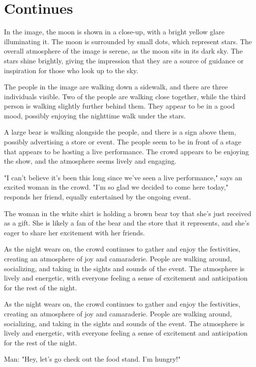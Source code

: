 \documentclass[smalldemyvopaper,11pt,twoside,onecolumn,openright,extrafontsizes]{memoir}
\begin{document}
\chapter{Continues}
In the image, the moon is shown in a close-up, with a bright yellow glare illuminating it. The moon is surrounded by small dots, which represent stars. The overall atmosphere of the image is serene, as the moon sits in its dark sky. The stars shine brightly, giving the impression that they are a source of guidance or inspiration for those who look up to the sky.\par
The people in the image are walking down a sidewalk, and there are three individuals visible. Two of the people are walking close together, while the third person is walking slightly further behind them. They appear to be in a good mood, possibly enjoying the nighttime walk under the stars.\par
A large bear is walking alongside the people, and there is a sign above them, possibly advertising a store or event. The people seem to be in front of a stage that appears to be hosting a live performance. The crowd appears to be enjoying the show, and the atmosphere seems lively and engaging.\par
"I can't believe it's been this long since we've seen a live performance," says an excited woman in the crowd. "I'm so glad we decided to come here today," responds her friend, equally entertained by the ongoing event.\par
The woman in the white shirt is holding a brown bear toy that she's just received as a gift. She is likely a fan of the bear and the store that it represents, and she's eager to share her excitement with her friends.\par
As the night wears on, the crowd continues to gather and enjoy the festivities, creating an atmosphere of joy and camaraderie. People are walking around, socializing, and taking in the sights and sounds of the event. The atmosphere is lively and energetic, with everyone feeling a sense of excitement and anticipation for the rest of the night.\par
As the night wears on, the crowd continues to gather and enjoy the festivities, creating an atmosphere of joy and camaraderie. People are walking around, socializing, and taking in the sights and sounds of the event. The atmosphere is lively and energetic, with everyone feeling a sense of excitement and anticipation for the rest of the night.\par
Man: "Hey, let's go check out the food stand. I'm hungry!"\par
\end{document}
